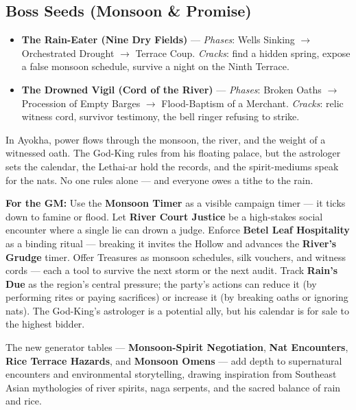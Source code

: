 \subsection*{Boss Seeds (Monsoon \& Promise)}
\begin{itemize}
\item \textbf{The Rain-Eater (Nine Dry Fields)} --- \emph{Phases}: Wells Sinking $\rightarrow$ Orchestrated Drought $\rightarrow$ Terrace Coup. \emph{Cracks}: find a hidden spring, expose a false monsoon schedule, survive a night on the Ninth Terrace.
\item \textbf{The Drowned Vigil (Cord of the River)} --- \emph{Phases}: Broken Oaths $\rightarrow$ Procession of Empty Barges $\rightarrow$ Flood-Baptism of a Merchant. \emph{Cracks}: relic witness cord, survivor testimony, the bell ringer refusing to strike.
\end{itemize}

\begin{tcolorbox}[colback=black!3,colframe=black!40!white,title={Patronage \& Power},breakable]
In Ayokha, power flows through the monsoon, the river, and the weight of a witnessed oath. The God-King rules from his floating palace, but the astrologer sets the calendar, the Lethai-ar hold the records, and the spirit-mediums speak for the nats. No one rules alone --- and everyone owes a tithe to the rain.

\textbf{For the GM:}  
Use the \textbf{Monsoon Timer } as a visible campaign timer --- it ticks down to famine or flood. Let \textbf{River Court Justice} be a high-stakes social encounter where a single lie can drown a judge. Enforce \textbf{Betel Leaf Hospitality} as a binding ritual --- breaking it invites the Hollow and advances the \textbf{River's Grudge} timer. Offer Treasures as monsoon schedules, silk vouchers, and witness cords --- each a tool to survive the next storm or the next audit. Track \textbf{Rain's Due} as the region's central pressure; the party's actions can reduce it (by performing rites or paying sacrifices) or increase it (by breaking oaths or ignoring nats). The God-King's astrologer is a potential ally, but his calendar is for sale to the highest bidder.

The new generator tables --- \textbf{Monsoon-Spirit Negotiation}, \textbf{Nat Encounters}, \textbf{Rice Terrace Hazards}, and \textbf{Monsoon Omens} --- add depth to supernatural encounters and environmental storytelling, drawing inspiration from Southeast Asian mythologies of river spirits, naga serpents, and the sacred balance of rain and rice.
\end{tcolorbox}


